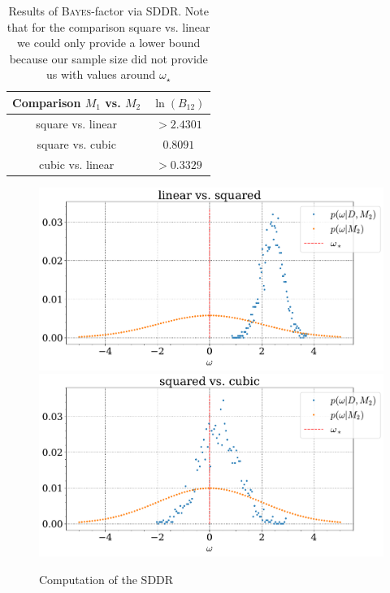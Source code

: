 \documentclass[%
 reprint,
 amsmath,amssymb,
 aps,
]{revtex4-1}
\begin{document}
\begin{table}[htbp]
	{\renewcommand{\arraystretch}{1.3}
		\begin{tabular}{|c|c|}
			\hline
			Comparison $M_1$ vs. $M_2$ & $\ln(B_{12})$  \\
			\hline
			square vs. linear& $>2.4301$\\
			square vs. cubic&$0.8091$  \\
			cubic vs. linear & $>0.3329$\\
			\hline
	\end{tabular}}
	\caption{Results of \textsc{Bayes}-factor via SDDR. Note that for the comparison square vs. linear we could only provide a lower bound because our sample size did not provide us with values around $\omega_\star$ }
	\label{tab:res_sddr}
\end{table}
\begin{figure}[h]
	\centering
	\includegraphics[width=\linewidth]{SDDR_linear vs. squared_sigma_07a+.pdf}
	\includegraphics[width=\linewidth]{SDDR_squared vs. cubic_sigma_07a+.pdf}
	\caption{Computation of the SDDR}
	\label{fig:sddr}
\end{figure}
\end{document}
